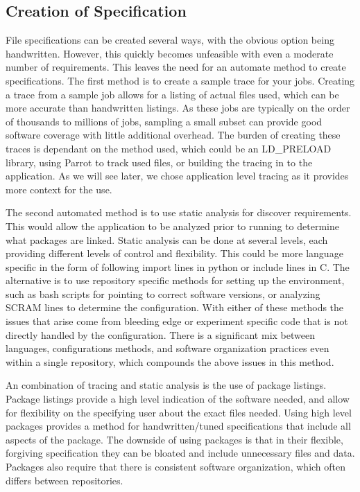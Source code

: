 \documentclass[conference]{IEEEtran}
\begin{document}
\subsection{Creation of Specification}
File specifications can be created several ways,
with the obvious option being handwritten.
However, this quickly becomes unfeasible with
even a moderate number of requirements.
This leaves the need for an automate method to create
specifications.
The first method is to create a sample trace for your
jobs. 
Creating a trace from a sample job allows 
for a listing of actual files used, which
can be more accurate than handwritten listings.
As these jobs are typically on the order of thousands
to millions of jobs, sampling a small subset
can provide good software coverage with little
additional overhead. %
The burden of creating these traces is
dependant on the method used,
which could be an LD\_PRELOAD library,
using Parrot to track used files, %
or building the tracing in to the application.
As we will see later, we chose application
level tracing as it provides more context
for the use.

The second automated method is to use static
analysis for discover requirements.
This would allow the application to be analyzed
prior to running to determine what packages are
linked.
Static analysis can be done at several levels,
each providing different levels of control 
and flexibility.
This could be more language specific in the 
form of following import lines in python or
include lines in C.
The alternative is to use repository specific 
methods for setting up the environment,
such as bash scripts for pointing to correct 
software versions, or 
analyzing SCRAM\cite{DBLP:journals/corr/cs-OH-0306014} lines
to determine the configuration.
With either of these methods the issues
that arise come from bleeding edge or
experiment specific code that is not directly
handled by the configuration.
There is a significant mix between languages,
configurations methods, and software organization
practices even within a single repository,
which compounds the above issues in this method.

An combination of tracing and static analysis is the
use of package listings. 
Package listings provide a high level indication
of the software needed, and allow for 
flexibility on the specifying user about the
exact files needed.
Using high level packages provides a method
for handwritten/tuned specifications that 
include all aspects of the package.
The downside of using packages is that in
their flexible, forgiving specification
they can be bloated and include unnecessary
files and data.
Packages also require that there is consistent
software organization, which often differs
between repositories.
\end{document}
